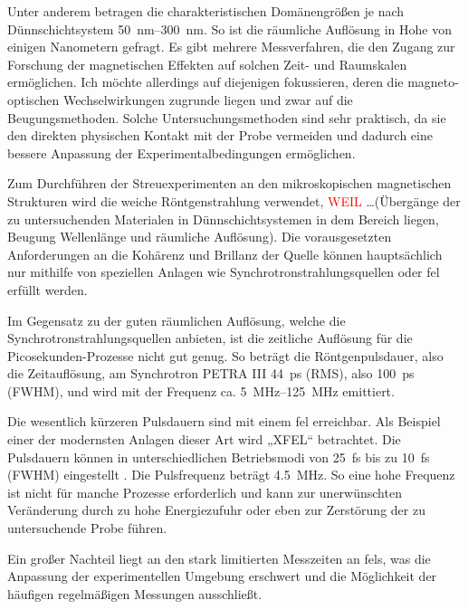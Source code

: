 \noindent
Unter anderem betragen die charakteristischen Domänengrößen je nach Dünnschichtsystem \SIrange[range-units = single]{50}{300}{\nano\meter}. So ist die räumliche Auflösung in Hohe von einigen Nanometern gefragt. Es gibt mehrere Messverfahren, die den Zugang zur Forschung der magnetischen Effekten auf solchen Zeit- und Raumskalen ermöglichen. Ich möchte allerdings auf diejenigen fokussieren, deren die magneto-optischen Wechselwirkungen zugrunde liegen und zwar auf die Beugungsmethoden. Solche Untersuchungsmethoden sind sehr praktisch, da sie den direkten physischen Kontakt mit der Probe vermeiden und dadurch eine bessere Anpassung der Experimentalbedingungen ermöglichen.

\noindent
Zum Durchführen der Streuexperimenten an den mikroskopischen magnetischen Strukturen wird die weiche Röntgenstrahlung verwendet, \textcolor{red}{WEIL} \dots (Übergänge der zu untersuchenden Materialen in Dünnschichtsystemen in dem Bereich liegen, Beugung Wellenlänge und räumliche Auflösung).  Die vorausgesetzten Anforderungen an die Kohärenz und Brillanz der Quelle können hauptsächlich nur mithilfe von speziellen Anlagen wie Synchrotronstrahlungsquellen oder \gls{fel} erfüllt werden.  %

\noindent
Im Gegensatz zu der guten räumlichen Auflösung, welche die Synchrotronstrahlungsquellen anbieten, ist die zeitliche Auflösung für die Picosekunden-Prozesse nicht gut genug. So beträgt die Röntgenpulsdauer, also die Zeitauflösung, am Synchrotron PETRA III \SI{44}{\pico\second} (RMS), also \SI{100}{\pico\second} (FWHM), und wird mit der Frequenz ca. \SIrange[range-units = single]{5}{125}{\mega\hertz} \cite{noauthor_machine_nodate} emittiert.

\noindent
Die wesentlich kürzeren Pulsdauern sind mit einem \gls{fel} erreichbar. Als Beispiel einer der modernsten Anlagen dieser Art wird „XFEL“ betrachtet. Die Pulsdauern können in unterschiedlichen Betriebsmodi von \SI{25}{\femto\second} bis zu \SI{10}{\femto\second} (FWHM) eingestellt \cite{tschentscher_photon_2017}. Die Pulsfrequenz beträgt \SI{4,5}{\mega\hertz}. So eine hohe Frequenz ist nicht für manche Prozesse erforderlich und kann zur unerwünschten Veränderung durch zu hohe Energiezufuhr oder eben zur Zerstörung der zu untersuchende Probe führen. 

\noindent
Ein großer Nachteil liegt an den stark limitierten Messzeiten an \gls{fel}s, was die Anpassung der experimentellen Umgebung erschwert und die Möglichkeit der häufigen regelmäßigen Messungen ausschließt.

